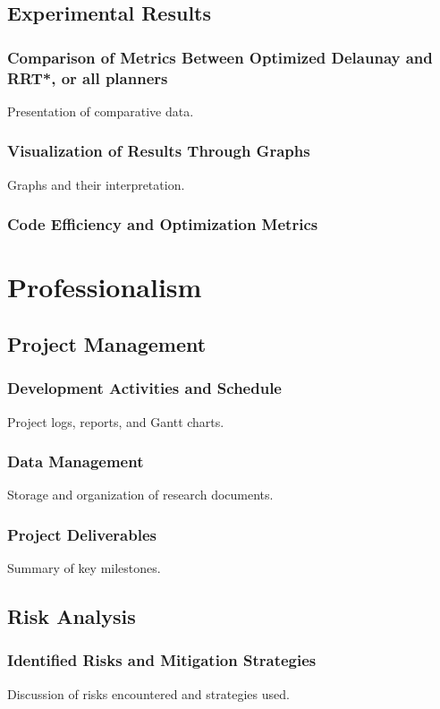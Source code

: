 \documentclass[a4paper,11pt]{report}
\begin{document}
\section{Experimental Results}
\subsection{Comparison of Metrics Between Optimized Delaunay and RRT*, or all planners}
Presentation of comparative data.

\subsection{Visualization of Results Through Graphs}
Graphs and their interpretation.

\subsection{Code Efficiency and Optimization Metrics}

\newpage

\chapter{Professionalism}
\section{Project Management}
\subsection{Development Activities and Schedule}
Project logs, reports, and Gantt charts.

\subsection{Data Management}
Storage and organization of research documents.

\subsection{Project Deliverables}
Summary of key milestones.

\section{Risk Analysis}
\subsection{Identified Risks and Mitigation Strategies}
Discussion of risks encountered and strategies used.
\end{document}
